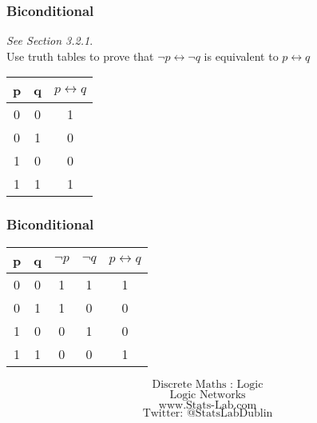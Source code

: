 \documentclass{beamer}
\begin{document}
\begin{frame}
\frametitle{Biconditional}
\emph{See Section 3.2.1}.\\
\Large
Use truth tables to prove that $ \neg p \leftrightarrow \neg q $ is equivalent to  $ p \leftrightarrow q $
\begin{center}
\begin{tabular}{|c|c|c|}
\hline  p& q & $p \leftrightarrow q$ \\ 
\hline  0& 0 &  1\\ 
\hline  0& 1 &  0\\ 
\hline  1& 0 &  0\\ 
\hline  1& 1 &  1\\ 
\hline 
\end{tabular}
\end{center} 
\end{frame}
\begin{frame}
\frametitle{Biconditional}
\Large
\vspace{-1cm}
\begin{tabular}{|c|c|c|c|c|}
\hline  \phantom{sp} p \phantom{sp} & \phantom{sp} q \phantom{sp} & $\neg p$ & $\neg q$ & $p \leftrightarrow q$ \\ 
\hline  0& 0 & 1& 1 & 1\\ 
\hline  0& 1 &  1& 0& 0\\ 
\hline  1& 0 &  0& 1& 0\\ 
\hline  1& 1 &  0 & 0& 1\\ 
\hline 
\end{tabular} 
\end{frame}
\begin{frame}
\Huge
\[\mbox{Discrete Maths :  Logic}\]
\[\mbox{Logic Networks}\]
\bigskip
\LARGE
\[\mbox{www.Stats-Lab.com}\]
\[\mbox{Twitter: @StatsLabDublin}\]
\end{frame}
\end{document}
